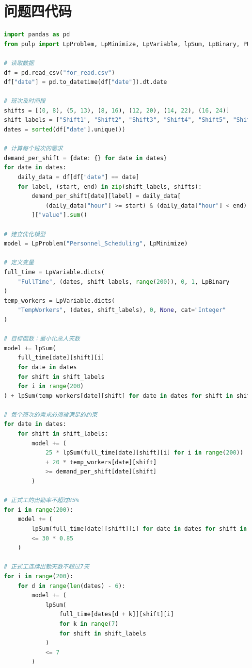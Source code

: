 \documentclass[UTF8]{article}%
\begin{document}
\section{问题四代码}
\begin{lstlisting}[language=python]
import pandas as pd
from pulp import LpProblem, LpMinimize, LpVariable, lpSum, LpBinary, PULP_CBC_CMD

# 读取数据
df = pd.read_csv("for_read.csv")
df["date"] = pd.to_datetime(df["date"]).dt.date

# 班次及时间段
shifts = [(0, 8), (5, 13), (8, 16), (12, 20), (14, 22), (16, 24)]
shift_labels = ["Shift1", "Shift2", "Shift3", "Shift4", "Shift5", "Shift6"]
dates = sorted(df["date"].unique())

# 计算每个班次的需求
demand_per_shift = {date: {} for date in dates}
for date in dates:
    daily_data = df[df["date"] == date]
    for label, (start, end) in zip(shift_labels, shifts):
        demand_per_shift[date][label] = daily_data[
            (daily_data["hour"] >= start) & (daily_data["hour"] < end)
        ]["value"].sum()

# 建立优化模型
model = LpProblem("Personnel_Scheduling", LpMinimize)

# 定义变量
full_time = LpVariable.dicts(
    "FullTime", (dates, shift_labels, range(200)), 0, 1, LpBinary
)
temp_workers = LpVariable.dicts(
    "TempWorkers", (dates, shift_labels), 0, None, cat="Integer"
)

# 目标函数：最小化总人天数
model += lpSum(
    full_time[date][shift][i]
    for date in dates
    for shift in shift_labels
    for i in range(200)
) + lpSum(temp_workers[date][shift] for date in dates for shift in shift_labels)

# 每个班次的需求必须被满足的约束
for date in dates:
    for shift in shift_labels:
        model += (
            25 * lpSum(full_time[date][shift][i] for i in range(200))
            + 20 * temp_workers[date][shift]
            >= demand_per_shift[date][shift]
        )

# 正式工的出勤率不超过85%
for i in range(200):
    model += (
        lpSum(full_time[date][shift][i] for date in dates for shift in shift_labels)
        <= 30 * 0.85
    )

# 正式工连续出勤天数不超过7天
for i in range(200):
    for d in range(len(dates) - 6):
        model += (
            lpSum(
                full_time[dates[d + k]][shift][i]
                for k in range(7)
                for shift in shift_labels
            )
            <= 7
        )


\end{lstlisting}
\end{document}
